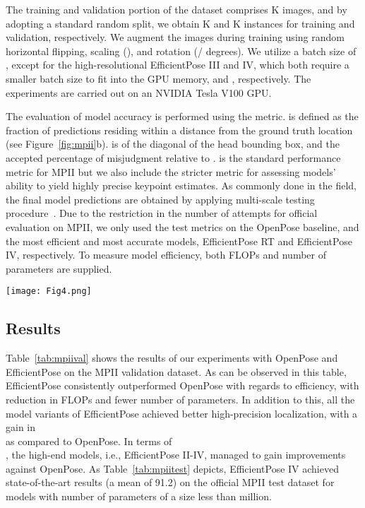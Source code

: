 The training and validation portion of the dataset comprises K images, and by adopting a standard random split, we obtain K and K instances for training and validation, respectively. We augment the images during training using random horizontal flipping, scaling (), and rotation (/  degrees). We utilize a batch size of , except for the high-resolutional EfficientPose III and IV, which both require a smaller batch size to fit into the GPU memory,  and , respectively. The experiments are carried out on an NVIDIA Tesla V100 GPU. 

The evaluation of model accuracy is performed using the  metric.  is defined as the fraction of predictions residing within a distance  from the ground truth location (see Figure~\ref{fig:mpii}b).  is  of the diagonal  of the head bounding box, and  the accepted percentage of misjudgment relative to .  is the standard performance metric for MPII but we also include the stricter  metric for assessing models’ ability to yield highly precise keypoint estimates. As commonly done in the field, the final model predictions are obtained by applying multi-scale testing procedure~\cite{yang2017learning, sun2019deep, tang2018deeply}. Due to the restriction in the number of attempts for official evaluation on MPII, we only used the test metrics on the OpenPose baseline, and the most efficient and most accurate models, EfficientPose RT and EfficientPose IV, respectively. To measure model efficiency, both FLOPs and number of parameters are supplied.

\begin{figure*}
\begin{center}
\texttt{[image: Fig4.png]}
\caption{The MPII single-person pose estimation challenge. From left: a) 10 images from the MPII test set displaying some of the variation and difficulties inherent in this challenge. b) The evaluation metrics  and  define the average of predictions within  distance () from the ground-truth location (e.g., left elbow), with  being 50\% and 10\%, respectively}
\label{fig:mpii}     
\end{center}
\end{figure*}

\subsection{Results}
\label{sec:results}

Table~\ref{tab:mpiival} shows the results of our experiments with OpenPose and EfficientPose on the MPII validation dataset. As can be observed in this table, EfficientPose consistently outperformed OpenPose with regards to efficiency, with  reduction in FLOPs and  fewer number of parameters. In addition to this, all the model variants of EfficientPose achieved better high-precision localization, with a  gain in \\  as compared to OpenPose. In terms of\\, the high-end models, i.e., EfficientPose II-IV, managed to gain  improvements against OpenPose. As Table~\ref{tab:mpiitest} depicts, EfficientPose IV achieved state-of-the-art results (a mean  of 91.2) on the official MPII test dataset for models with number of parameters of a size less than  million.

